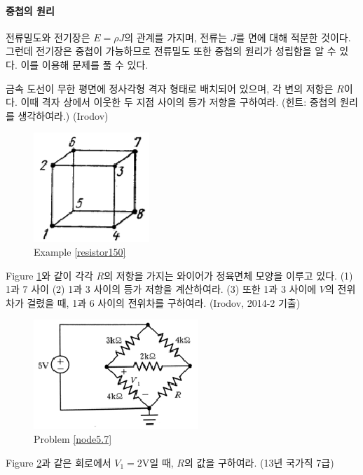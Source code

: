 \paragraph{중첩의 원리}
전류밀도와 전기장은 $E=\rho J$의 관계를 가지며, 전류는 $J$를 면에 대해 적분한 것이다. 그런데 전기장은 중첩이 가능하므로 전류밀도 또한 중첩의 원리가 성립함을 알 수 있다. 이를 이용해 문제를 풀 수 있다. 
\begin{exercise}\label{resistor153}
금속 도선이 무한 평면에 정사각형 격자 형태로 배치되어 있으며, 각 변의 저항은 $R$이다. 이때 격자 상에서 이웃한 두 지점 사이의 등가 저항을 구하여라. (힌트: 중첩의 원리를 생각하여라.) (Irodov)
\end{exercise}

\begin{figure}[h]
\centering\includegraphics[scale=1.5]{Pictures/3.150.eps}
\caption{Example \ref{resistor150}}
\label{fig:resistor150}
\end{figure}


\begin{problem}\label{resistor150}
Figure \ref{fig:resistor150}와 같이 각각 $R$의 저항을 가지는 와이어가 정육면체 모양을 이루고 있다. (1) 1과 7 사이 (2) 1과 3 사이의 등가 저항을 계산하여라. (3) 또한 1과 3 사이에 $V$의 전위차가 걸렸을 때, 1과 6 사이의 전위차를 구하여라. (Irodov, 2014-2 기출)
\end{problem}

\begin{problem}\label{node5.7}
\begin{figure}[h]
\centering\includegraphics[scale=1.5]{Pictures/node5.7.eps}
\caption{Problem \ref{node5.7}}
\label{fig:node5.7}
\end{figure}
Figure \ref{fig:node5.7}과 같은 회로에서 $V_1=2\mathrm{V}$일 때, $R$의 값을 구하여라. (13년 국가직 7급)
\end{problem}

